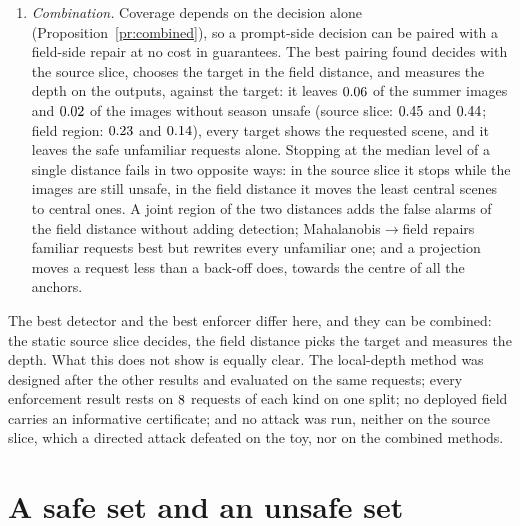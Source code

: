 \documentclass{article}
\theoremstyle{plain}
\theoremstyle{remark}
\begin{document}
\begin{enumerate}[label=(Q\arabic*)]
unsafe set than to one another.
\item \emph{Combination.} Coverage depends on the decision alone (Proposition~\ref{pr:combined}), so a prompt-side decision can be
paired with a field-side repair at no cost in guarantees. The best pairing found decides with the source slice, chooses the target in
the field distance, and measures the depth on the outputs, against the target: it leaves $0.06$ of the summer images and
$0.02$ of the images without season unsafe (source slice: $0.45$ and $0.44$; field region:
$0.23$ and $0.14$), every target shows the requested scene, and it leaves the safe unfamiliar requests alone.
Stopping at the median level of a single distance fails in two opposite ways: in the source slice it stops while the images are still
unsafe, in the field distance it moves the least central scenes to central ones. A joint region of the two distances adds the false
alarms of the field distance without adding detection; Mahalanobis$\to$field repairs familiar requests best but rewrites every
unfamiliar one; and a projection moves a request less than a back-off does, towards the centre of all the anchors.
\end{enumerate}
The best detector and the best enforcer differ here, and they can be combined: the static source slice decides, the field distance
picks the target and measures the depth. What this does not show is equally clear. The local-depth method was designed after the
other results and evaluated on the same requests; every enforcement result rests on $8$ requests of each kind on one split;
no deployed field carries an informative certificate; and no attack was run, neither on the source slice, which a directed attack
defeated on the toy, nor on the combined methods.

\section{A safe set and an unsafe set}\label{sec:e3u}
\end{document}
